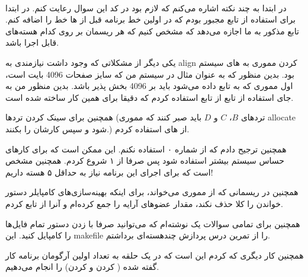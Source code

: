 \\\noindent
در ابتدا به چند نکته اشاره می‌کنم که لازم بود در کد این سوال رعایت کنم.
در ابتدا برای استفاده از تابع
مجبور بودم که در اولین خط برنامه قبل از
ها
خط
را اضافه کنم.
تابع مذکور به ما اجازه می‌دهد که مشخص کنیم که هر ریسمان بر روی کدام هسته‌های
قابل اجرا باشد.

یکی دیگر از مشکلاتی که وجود داشت نیازمندی به
align
کردن مموری به
های
سیستم بود. بدین منظور که به عنوان مثال در سیستم من که سایز صفحات 4096 بایت است،‌ اول مموری که
به تابع
داده می‌شود باید بر 4096 بخش پذیر باشد.
بدین منظور من به جای استفاده از تابع
از تابع
استفاده کردم که دقیقا برای همین کار ساخته شده است.

همچنین برای سینک کردن ترد‌ها
(ترد‌های $B$، $C$ و $D$ باید صبر کنند که مموری allocate شود و سپس کارشان را بکنند.)
از های 
استفاده کردم.

همچنین ترجیح دادم که از
شماره ۰ استفاده نکنم. این
ممکن است که برای کار‌های حساس سیستم بیشتر استفاده شود پس صرفا از ۱ شروع کردم.
همچنین مشخص است که برای اجرای این برنامه نیاز به حداقل ۵ هسته داریم!

همچنین در ریسمانی که از مموری می‌خواند، برای اینکه بهینه‌سازی‌های کامپایلر دستور خواندن را کلا
حذف نکند، مقدار عضو‌های آرایه را جمع کرده‌ام و آنرا از تابع
کردم.

همچنین برای تمامی سوالات یک
نوشته‌ام که می‌توانید صرفا با زدن دستور
تمام فایل‌ها را کامپایل کنید. این makefile
را از تمرین درس پردازش چند‌هسته‌ای برداشتم.

همچنین کار دیگری که کردم این است که در یک حلقه به تعداد اولین آرگومان برنامه کار گفته شده
( کردن و  کردن)
را انجام می‌دهیم.

